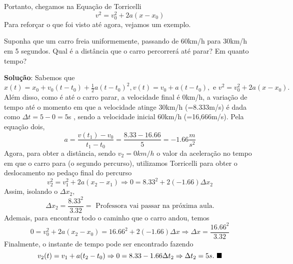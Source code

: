 \documentclass[physics_notes.tex]{subfiles}
\begin{document}
 Portanto, chegamos na Equação de Torricelli
  $$
  \boxed{v^{2} = v_{0}^{2} + 2a(x-x_{0})}
  $$
  Para reforçar o que foi visto até agora, vejamos um exemplo.
 \begin{example}
   Suponha que um carro freia uniformemente, passando de 60km/h para 30km/h em 5 segundos. Qual é a distância
que o carro percorrerá até parar? Em quanto tempo?

  \textbf{Solução}: Sabemos que $x(t) = x_{0} + v_{0}(t-t_{0}) + \frac{1}{2}a(t-t_{0})^{2}, v(t) = v_{0} + a(t-t_{0}),
\text{ e }v^{2} = v_{0}^{2} + 2a(x-x_{0}).$ Além disso, como é até o carro parar, a velocidade final é 0km/h, a variação
de tempo até o momento em que a velocidade atinge 30km/h (=8.333m/s) é dada como $\Delta t = 5 - 0 = 5$s , sendo a velocidade inicial 60km/h (=16,666m/s). 
Pela equação dois, 
  $$
    a = \frac{v(t_{1}) - v_{0}}{t_{1}-t_{0}} = \frac{8.33 - 16.66}{5} = -1.66\frac{m}{s^{2}}
  $$
  Agora, para obter a distância, sendo $v_{2} = 0km/h$ o valor da aceleração no tempo em que o carro para (o segundo percurso),
utilizamos Torricelli para obter o deslocamento no pedaço final do percurso
  $$
    v_{2}^{2} = v_{1}^{2} + 2a(x_{2}-x_{1}) \Rightarrow 0 = 8.33^{2} + 2(-1.66)\Delta x_{2}
  $$
  Assim, isolando o $\Delta x_{2},$  
    $$
    \Delta x_{2} = \frac{8.33^{2}}{3.32} = \text{ Professora vai passar na próxima aula.}
    $$
  Ademais, para encontrar todo o caminho que o carro andou, temos 
    $$
      0 = v_{0}^{2} + 2a(x_{2} - x_{0}) = 16.66^{2} + 2(-1.66)\Delta x \Rightarrow \Delta x = \frac{16.66^{2}}{3.32}
    $$
  Finalmente, o instante de tempo pode ser encontrado fazendo 
    $$
    v_{2}(t) = v_{1} + a(t_{2}-t_{0}) \Rightarrow 0 = 8.33 - 1.66\Delta t_{2} \Rightarrow \Delta t_{2} = 5s.\text{ $\blacksquare$}
    $$
 \end{example}
\end{document}
